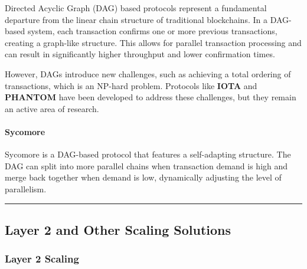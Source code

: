 Directed Acyclic Graph (DAG) based protocols represent a fundamental
departure from the linear chain structure of traditional blockchains. In
a DAG-based system, each transaction confirms one or more previous
transactions, creating a graph-like structure. This allows for parallel
transaction processing and can result in significantly higher throughput
and lower confirmation times.


However, DAGs introduce new challenges, such as achieving a total
ordering of transactions, which is an NP-hard problem. Protocols like
\textbf{IOTA} and \textbf{PHANTOM} have been developed to address these
challenges, but they remain an active area of research.

\paragraph{Sycomore}\label{sycomore}

Sycomore is a DAG-based protocol that features a self-adapting
structure. The DAG can split into more parallel chains when transaction
demand is high and merge back together when demand is low, dynamically
adjusting the level of parallelism.


\begin{center}\rule{0.5\linewidth}{0.5pt}\end{center}

\subsection{Layer 2 and Other Scaling
Solutions}\label{section-4-layer-2-and-other-scaling-solutions}

\subsubsection{Layer 2 Scaling}\label{layer-2-scaling}

